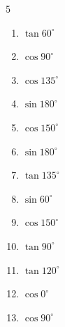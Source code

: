 \begin{multicols}{5}
\begin{enumerate}

  \item $\displaystyle \tan{60^\circ}$


  \item $\displaystyle \cos{90^\circ}$

        \phantom{$\displaystyle =0$}

  \item $\displaystyle \cos{135^\circ}$


  \item $\displaystyle \sin{180^\circ}$

        \phantom{$\displaystyle =0$}

  \item $\displaystyle \cos{150^\circ}$


  \item $\displaystyle \sin{180^\circ}$

        \phantom{$\displaystyle =0$}

  \item $\displaystyle \tan{135^\circ}$

        \phantom{$\displaystyle =-1$}

  \item $\displaystyle \sin{60^\circ}$


  \item $\displaystyle \cos{150^\circ}$


  \item $\displaystyle \tan{90^\circ}$

        \phantom{$\displaystyle なし$}

  \item $\displaystyle \tan{120^\circ}$


  \item $\displaystyle \cos{0^\circ}$

        \phantom{$\displaystyle =1$}

  \item $\displaystyle \cos{90^\circ}$


\end{enumerate}
\end{multicols}
